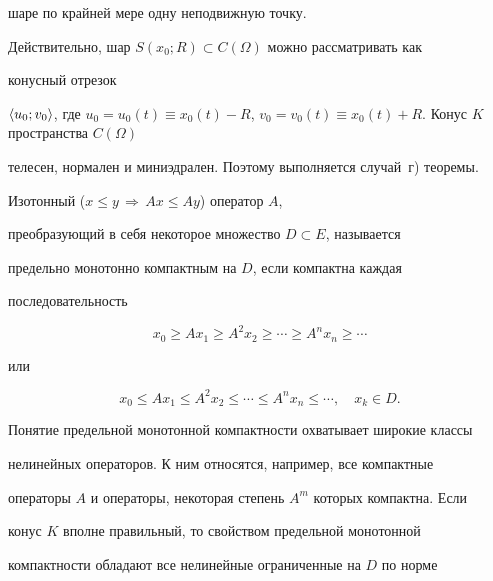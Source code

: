 шаре по крайней мере одну неподвижную точку. 


\medskip 


 


Действительно, шар $S(x_0;R)\subset C(\Omega)$ можно рассматривать как 


конусный отрезок 


$\la u_0;v_0\ra$, где $u_0=u_0(t)\equiv x_0(t)-R$, $v_0=v_0(t)\equiv 


x_0(t)+R$. Конус $K$ пространства $C(\Omega)$ 


телесен, нормален и миниэдрален. Поэтому выполняется случай~г) теоремы. 


 


\begin{defn} 


Изотонный ($x\le y\,\Rightarrow\,Ax\le A y$) оператор $A$, 


преобразующий в себя некоторое множество $D\subset E$, называется 


предельно монотонно компактным на $D$, если компактна каждая 


последовательность 


\begin{equation} 


x_0\ge Ax_1\ge A^2x_2\ge\dotsb\ge A^n x_n\ge\dotsb 


\end{equation} 


или 


\begin{equation} 


x_0\le Ax_1\le A^2x_2\le\dotsb\le A^n x_n\le\dotsb,\quad x_k\in D. 


\end{equation} 


\end{defn} 


 


Понятие предельной монотонной компактности охватывает широкие классы 


нелинейных операторов. К ним относятся, например, все компактные 


операторы $A$ и операторы, некоторая степень $A^m$ которых компактна. Если 


конус $K$ вполне правильный, то свойством предельной монотонной 


компактности обладают все нелинейные ограниченные на $D$ по норме 



